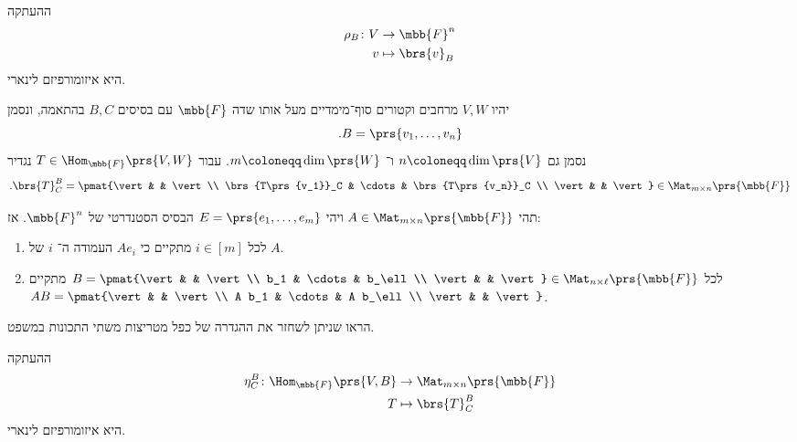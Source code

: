 \documentclass[a4paper,10pt,twoside,openany]{book}
\begin{document}
\begin{remark}
ההעתקה
\begin{align*}
\rho_B \colon V &\to \mbb{F}^n \\
v &\mapsto \brs{v}_B
\end{align*}
היא איזומורפיזם לינארי.
\end{remark}

\begin{definition}
יהיו
$V,W$
מרחבים וקטורים סוף־מימדיים מעל אותו שדה
$\mbb{F}$
עם בסיסים
$B,C$
בהתאמה, ונסמן
\[\text{.} B = \prs{v_1, \ldots, v_n}\]
נסמן גם
$n \coloneqq \dim\prs{V}$
ו־%
$m \coloneqq \dim\prs{W}$.
עבור
$T \in \Hom_{\mbb{F}}\prs{V,W}$
נגדיר
\[\text{.} \brs{T}^B_C = \pmat{\vert & & \vert \\ \brs{T\prs{v_1}}_C & \cdots & \brs{T\prs{v_n}}_C \\ \vert & & \vert} \in \Mat_{m \times n}\prs{\mbb{F}}\]
\end{definition}

\begin{theorem}
תהי
$A \in \Mat_{m \times n}\prs{\mbb{F}}$
ויהי
$E = \prs{e_1, \ldots, e_m}$
הבסיס הסטנדרטי של
$\mbb{F}^n$.
אז:
\begin{enumerate}[label = (\roman*)]
\item
לכל
$i \in [m]$
מתקיים כי
$A e_i$
העמודה ה־%
$i$
של
$A$.
\item
לכל
$B = \pmat{\vert & & \vert \\ b_1 & \cdots & b_\ell \\ \vert & & \vert} \in \Mat_{n \times \ell}\prs{\mbb{F}}$
מתקיים
$AB = \pmat{\vert & & \vert \\ A b_1 & \cdots & A b_\ell \\ \vert & & \vert}$.
\end{enumerate}
\end{theorem}

\begin{exercisechap}
הראו שניתן לשחזר את ההגדרה של כפל מטריצות משתי התכונות במשפט.
\end{exercisechap}

\begin{remark}
ההעתקה
\begin{align*}
\eta^B_C \colon \Hom_{\mbb{F}}\prs{V,B} &\to \Mat_{m \times n}\prs{\mbb{F}} \\
T &\mapsto \brs{T}^B_C
\end{align*}
היא איזומורפיזם לינארי.
\end{remark}
\end{document}
